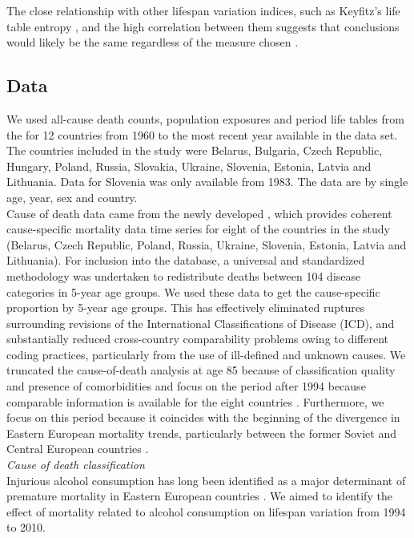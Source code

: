 \documentclass{article}
\begin{document}
\begin{spacing}{1.5}
 
The close relationship with other lifespan variation indices, such as Keyfitz's life table entropy \citep{vaupel&Canudas2003}, and the high correlation between them suggests that conclusions would likely be the same regardless of the measure chosen \citep{vanraalte2013,vaupel2011,wilmoth1999}.\\


\subsection*{Data}
We used all-cause death counts, population exposures and period life tables from the \citet{HMD} for 12 countries from 1960 to the most recent year available in the data set. The countries included in the study were Belarus, Bulgaria, Czech Republic, Hungary, Poland, Russia, Slovakia, Ukraine, Slovenia, Estonia, Latvia and Lithuania. Data for Slovenia was only available from 1983. The data are by single age, year, sex and country.\\

Cause of death data came from the newly developed \citet{HcO}, which provides coherent cause-specific mortality data time series for eight of the countries in the study (Belarus, Czech Republic, Poland, Russia, Ukraine, Slovenia, Estonia, Latvia and Lithuania). For inclusion into the database, a universal and standardized methodology was undertaken to redistribute deaths between 104 disease categories in 5-year age groups. We used these data to get the cause-specific proportion by 5-year age groups. This has effectively eliminated ruptures surrounding revisions of the International Classifications of Disease (ICD), and substantially reduced cross-country comparability problems owing to different coding practices, particularly from the use of ill-defined and unknown causes. We truncated the cause-of-death analysis at age 85 because of classification quality and presence of comorbidities and focus on the period after 1994 because comparable information is available for the eight countries \citep{HcO}. Furthermore, we focus on this period because it coincides with the beginning of the divergence in Eastern European mortality trends, particularly between the former Soviet and Central European countries \citep{mesle2004mortality}.\\

\emph{Cause of death classification}\\

Injurious alcohol consumption has long been identified as a major determinant of premature mortality in Eastern European countries \citep{leon1997huge,mckee2001,rehm2007,grigoriev2015}. We aimed to identify the effect of mortality related to alcohol consumption on lifespan variation from 1994 to 2010. \\


\end{spacing}
\end{document}
